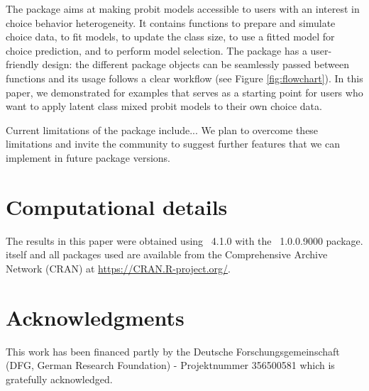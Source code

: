 \documentclass[article,shortnames]{jss}
\begin{document}
The  package aims at making probit models accessible to  users with an interest in choice behavior heterogeneity. It contains functions to prepare and simulate choice data, to fit models, to update the class size, to use a fitted model for choice prediction, and to perform model selection. The  package has a user-friendly design: the different package objects can be seamlessly passed between functions and its usage follows a clear workflow (see Figure \ref{fig:flowchart}). In this paper, we demonstrated for examples that serves as a starting point for  users who want to apply latent class mixed probit models to their own choice data.

Current limitations of the  package include... We plan to overcome these limitations and invite the community to suggest further features that we can implement in future package versions.

\section*{Computational details}

The results in this paper were obtained using
~4.1.0 with the
~1.0.0.9000 package.  itself
and all packages used are available from the Comprehensive
 Archive Network (CRAN) at \url{https://CRAN.R-project.org/}.


\section*{Acknowledgments}

This work has been financed partly by the Deutsche Forschungsgemeinschaft (DFG, German Research Foundation) - Projektnummer 356500581 which is gratefully acknowledged.


\end{document}
